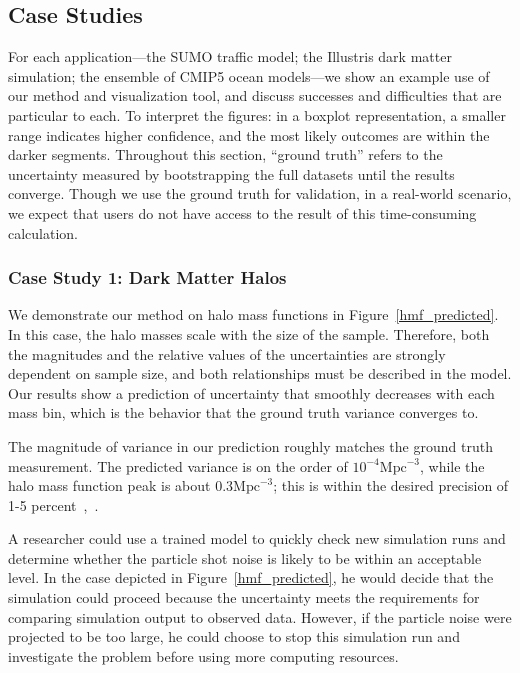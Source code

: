 \subsection{Case Studies}
\label{results}
For each application---the SUMO traffic model; the Illustris dark matter simulation; the ensemble of CMIP5 ocean models---we show an example use of our method and visualization tool, and discuss successes and difficulties that are particular to each. To interpret the figures: in a boxplot representation, a smaller range indicates higher confidence, and the most likely outcomes are within the darker segments. Throughout this section, ``ground truth'' refers to the uncertainty measured by bootstrapping the full datasets until the results converge. Though we use the ground truth for validation, in a real-world scenario, we expect that users do not have access to the result of this time-consuming calculation.

\subsubsection{Case Study 1: Dark Matter Halos}
We demonstrate our method on halo mass functions in Figure~\ref{hmf_predicted}. In this case,  the halo masses scale with the size of the sample. Therefore, both the magnitudes and the relative values of the uncertainties are strongly dependent on sample size, and both relationships must be described in the model. Our results show a prediction of uncertainty that smoothly decreases with each mass bin, which is the behavior that the ground truth variance converges to.

The magnitude of variance in our prediction roughly matches the ground truth measurement. The predicted variance is on the order of $10^{-4} \mathrm{Mpc}^{-3}$, while the halo mass function peak is about $0.3\mathrm{Mpc}^{-3}$; this is within the desired precision of 1-5 percent~\cite{behroozi},~\cite{tinker}. 

A researcher could use a trained model to quickly check new simulation runs and determine whether the particle shot noise is likely to be within an acceptable level. In the case depicted in Figure~\ref{hmf_predicted}, he would decide that the simulation could proceed because the uncertainty meets the requirements for comparing simulation output to observed data. However, if the particle noise were projected to be too large, he could choose to stop this simulation run and investigate the problem before using more computing resources.

